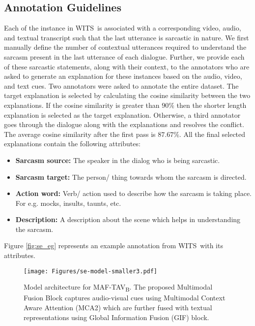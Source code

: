 \documentclass[11pt]{article}
\newcommand{\dataset}{\textsc{WITS}}
\newcommand{\modelTAV}{\textsc{MAF-TAV\textsubscript{B}}}
\begin{document}
\subsection{Annotation Guidelines}
\label{sec:app_annot}
Each of the instance in \dataset\
is associated with a corresponding video, audio, and textual transcript such that the last utterance is sarcastic in nature. We first manually define the number of contextual utterances required to understand the sarcasm present in the last utterance of each dialogue. Further, we provide each of these sarcastic statements, along with their context, to the annotators who are asked to generate an explanation for these instances based on the audio, video, and text cues. Two annotators were asked to annotate the entire dataset. The target explanation is selected by calculating the cosine similarity between the two explanations. If the cosine similarity is greater than $90\%$ then the shorter length explanation is selected as the target explanation. Otherwise, a third annotator goes through the dialogue along with the explanations and resolves the conflict. The average cosine similarity after the first pass is $87.67\%$. All the final selected explanations contain the following attributes:
\begin{itemize}[leftmargin=*,topsep=0pt]
    \setlength{\itemsep}{0pt}
    \setlength{\parskip}{0pt}
    \setlength{\parsep}{0pt}
        \item {\bf Sarcasm source:} The speaker in the dialog who is being sarcastic.
        \item {\bf Sarcasm target:} The person/ thing towards whom the sarcasm is directed.
        \item {\bf Action word:} Verb/ action used to describe how the sarcasm is taking place. For e.g. mocks, insults, taunts, etc.
        \item {\bf Description:} A description about the scene which helps in understanding the sarcasm.
\end{itemize}
Figure \ref{fig:se_eg} represents an example annotation from \dataset\ with its attributes.

\begin{figure*}[h!]
    \centering
    \texttt{[image: Figures/se-model-smaller3.pdf]}
    \caption{Model architecture for \modelTAV. The proposed Multimodal Fusion Block captures audio-visual cues using Multimodal Context Aware Attention (MCA2) which are further fused with textual representations using Global Information Fusion (GIF) block.}
    \label{fig:model_arch}
\end{figure*}
\end{document}
